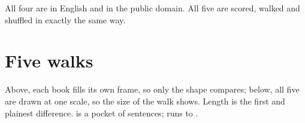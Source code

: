 \noindent All four are in English and in the public domain. All five are
scored, walked and shuffled in exactly the same way.

\clearpage
\section{Five walks}

\begin{center}

\bigskip
{}
\end{center}

\noindent Above, each book fills its own frame, so only the shape compares;
below, all five are drawn at one scale, so the size of the walk shows. Length
is the first and plainest difference.  is a pocket of
 sentences;  runs to
.

